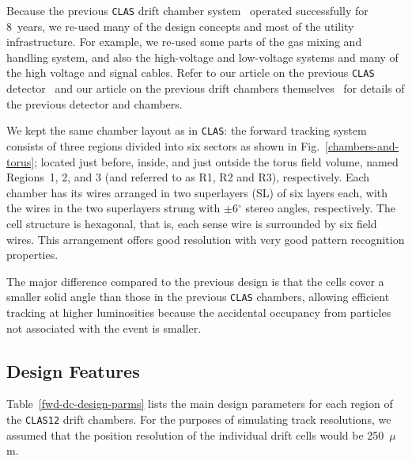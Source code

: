 Because the previous {\tt CLAS} drift chamber system~\cite{dcnim} operated 
successfully for 8~years, we re-used many of the design concepts and 
most of the utility infrastructure.  For example, we re-used some
parts of the gas mixing and handling system, and also the high-voltage 
and low-voltage systems and many of the high voltage and signal cables. 
Refer to our 
article on the previous {\tt CLAS} detector~\cite{clasnim} and our article 
on the previous drift chambers themselves~\cite{dcnim} for details of the 
previous detector and chambers.  

We kept the same chamber layout as in {\tt CLAS}:
the forward tracking system consists of three regions divided into six
sectors as shown in Fig.~\ref{chambers-and-torus}; located just before, inside, 
and just outside the torus field volume, named Regions~1, 2, 
and 3 (and referred to as R1, R2 and R3), respectively.  
Each chamber has its wires arranged in two superlayers (SL) of
six layers each, with the wires in the two superlayers strung with 
$\pm$6$^\circ$ stereo angles, respectively.  The cell structure is 
hexagonal, that is, each sense wire is surrounded by six field wires.  This 
arrangement offers good 
resolution with very good pattern recognition properties.  

The major difference compared to the previous design is that the 
cells cover a smaller solid angle than those in the previous {\tt CLAS} 
chambers, allowing efficient tracking at higher luminosities because the 
accidental occupancy from particles not associated with the event is smaller.  

\subsection{Design Features}

Table~\ref{fwd-dc-design-parms} lists the main design parameters for each 
region of the {\tt CLAS12} drift chambers.  For the purposes of simulating 
track resolutions, we assumed that the position resolution of the individual 
drift cells would be 250~$\mu$m.  

